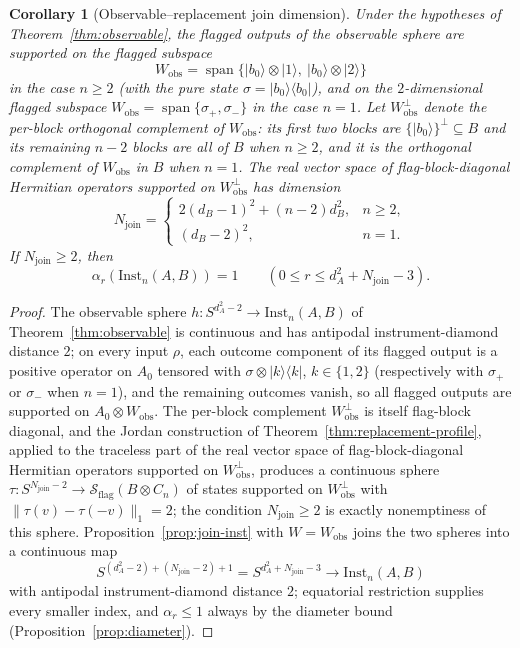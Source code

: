 \documentclass[11pt,a4paper]{article}
\newtheorem{corollary}[theorem]{Corollary}
\newcommand{\Sstate}{\mathcal{S}}
\newcommand{\Inst}{\mathrm{Inst}}
\begin{document}
\begin{corollary}[Observable--replacement join dimension]
\label{cor:join-dimension}
Under the hypotheses of Theorem~\ref{thm:observable}, the flagged outputs of the observable sphere are supported on the flagged subspace
\[
W_{\mathrm{obs}}=\operatorname{span}\{|b_0\rangle\otimes|1\rangle,\ |b_0\rangle\otimes|2\rangle\}
\]
in the case $n\ge2$ (with the pure state $\sigma=|b_0\rangle\langle b_0|$), and on the $2$-dimensional flagged subspace $W_{\mathrm{obs}}=\operatorname{span}\{\sigma_+,\sigma_-\}$ in the case $n=1$. Let $W_{\mathrm{obs}}^{\perp}$ denote the per-block orthogonal complement of $W_{\mathrm{obs}}$: its first two blocks are $\{|b_0\rangle\}^{\perp}\subseteq B$ and its remaining $n-2$ blocks are all of $B$ when $n\ge2$, and it is the orthogonal complement of $W_{\mathrm{obs}}$ in $B$ when $n=1$. The real vector space of flag-block-diagonal Hermitian operators supported on $W_{\mathrm{obs}}^{\perp}$ has dimension
\[
N_{\mathrm{join}}=
\begin{cases}
2(d_B-1)^2+(n-2)d_B^2,&n\ge2,\\
(d_B-2)^2,&n=1.
\end{cases}
\]
If $N_{\mathrm{join}}\ge2$, then
\[
\alpha_r(\Inst_n(A,B))=1\qquad(0\le r\le d_A^2+N_{\mathrm{join}}-3).
\]
\end{corollary}

\begin{proof}
The observable sphere $h:S^{d_A^2-2}\to\Inst_n(A,B)$ of Theorem~\ref{thm:observable} is continuous and has antipodal instrument-diamond distance $2$; on every input $\rho$, each outcome component of its flagged output is a positive operator on $A_0$ tensored with $\sigma\otimes|k\rangle\langle k|$, $k\in\{1,2\}$ (respectively with $\sigma_+$ or $\sigma_-$ when $n=1$), and the remaining outcomes vanish, so all flagged outputs are supported on $A_0\otimes W_{\mathrm{obs}}$. The per-block complement $W_{\mathrm{obs}}^{\perp}$ is itself flag-block diagonal, and the Jordan construction of Theorem~\ref{thm:replacement-profile}, applied to the traceless part of the real vector space of flag-block-diagonal Hermitian operators supported on $W_{\mathrm{obs}}^{\perp}$, produces a continuous sphere $\tau:S^{N_{\mathrm{join}}-2}\to\Sstate_{\mathrm{flag}}(B\otimes C_n)$ of states supported on $W_{\mathrm{obs}}^{\perp}$ with $\|\tau(v)-\tau(-v)\|_1=2$; the condition $N_{\mathrm{join}}\ge2$ is exactly nonemptiness of this sphere. Proposition~\ref{prop:join-inst} with $W=W_{\mathrm{obs}}$ joins the two spheres into a continuous map
\[
S^{(d_A^2-2)+(N_{\mathrm{join}}-2)+1}=S^{d_A^2+N_{\mathrm{join}}-3}\longrightarrow\Inst_n(A,B)
\]
with antipodal instrument-diamond distance $2$; equatorial restriction supplies every smaller index, and $\alpha_r\le1$ always by the diameter bound (Proposition~\ref{prop:diameter}).
\end{proof}
\end{document}
